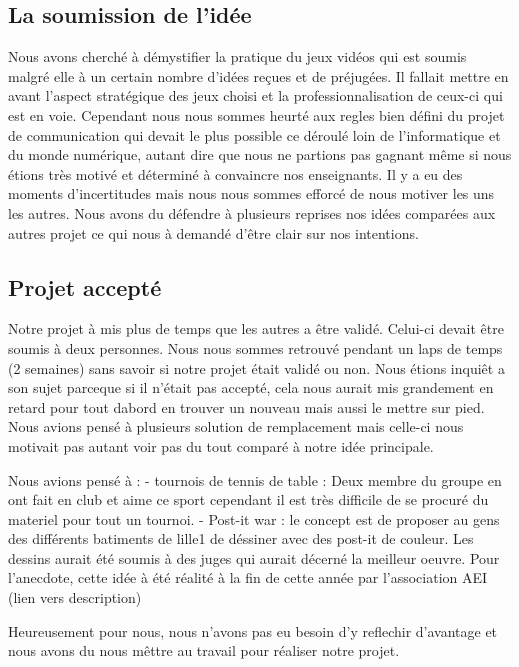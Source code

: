 \subsection{La soumission de l'idée}%
\label{sub:la_soumission_de_leidee}

Nous avons cherché à démystifier la pratique du jeux vidéos qui est
soumis malgré elle à un certain nombre d'idées reçues et de préjugées.
Il fallait mettre en avant l'aspect stratégique des jeux choisi et la
professionnalisation de ceux-ci qui est en voie. Cependant nous nous
sommes heurté aux regles bien défini du projet de communication qui
devait le plus possible ce déroulé loin de l'informatique et du monde
numérique, autant dire que nous ne partions pas gagnant même si nous
étions très motivé et déterminé à convaincre nos enseignants. Il y a eu
des moments d'incertitudes mais nous nous sommes efforcé de nous motiver
les uns les autres. Nous avons du défendre à plusieurs reprises nos
idées comparées aux autres projet ce qui nous à demandé d'être clair sur
nos intentions.


\subsection{Projet accepté}%
\label{sub:projet_accepte}

Notre projet à mis plus de temps que les autres a être validé.
Celui-ci devait être soumis à deux personnes. Nous nous sommes retrouvé
pendant un laps de temps (2 semaines) sans savoir si notre projet était
validé ou non. Nous étions inquiêt a son sujet parceque si il n'était
pas accepté, cela nous aurait mis grandement en retard pour tout dabord
en trouver un nouveau mais aussi le mettre sur pied. Nous avions pensé à
plusieurs solution de remplacement mais celle-ci nous motivait pas
autant voir pas du tout comparé à notre idée principale.

Nous avions pensé à :
  - tournois de tennis de table : Deux membre du groupe en ont fait
en club et aime ce sport cependant il est très difficile de se procuré
du materiel pour tout un tournoi.
  - Post-it war : le concept est de proposer au gens des différents
batiments de lille1 de déssiner avec des post-it de couleur. Les dessins
aurait été soumis à des juges qui aurait décerné la meilleur oeuvre.
Pour l'anecdote, cette idée à été réalité à la fin de cette année par
l'association AEI (lien vers description)

Heureusement pour nous, nous n'avons pas eu besoin d'y reflechir
d'avantage et nous avons du nous mêttre au travail pour réaliser notre
projet.

